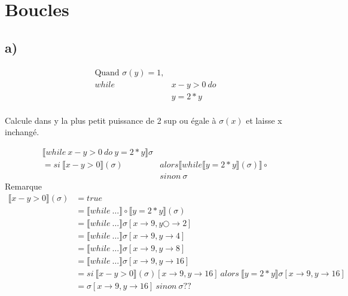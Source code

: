 \documentclass[11pt,a4paper]{article}
\newcommand{\llbr}{\llbracket}
\newcommand{\rrbr}{\rrbracket}
\begin{document}
	\section{Boucles}
	
	\subsection{a)}
	
	\begin{align*}
		\text{Quand } \sigma(y) = 1,&\\
		while\ &x - y > 0\ do\\
			&y = 2 * y\\
	\end{align*}
	
	Calcule dans y la plus petit puissance de 2 sup ou égale à $\sigma(x)$ et laisse x inchangé.
	
	\begin{align*}
		\llbracket while\ x - y > 0\ do\ y = 2 * y \rrbracket\sigma&\\
		= si\ \llbracket x - y > 0 \rrbracket(\sigma) &alors \llbracket while \llbracket y = 2 * y \rrbracket(\sigma)\rrbracket \circ\\
		&sinon\ \sigma
	\end{align*}
	Remarque
	\begin{align*}
		\llbracket x - y > 0 \rrbracket(\sigma) &= true\\
		&= \llbracket while\ \ldots \rrbracket \circ \llbracket y = 2 * y \rrbracket(\sigma)\\
		&= \llbr while\ \ldots \rrbr \sigma [ x \to 9, y○ \to 2]\\
		&= \llbr while\ \ldots \rrbr \sigma [x \to 9, y \to 4]\\
		&= \llbr while\ \ldots \rrbr \sigma [x \to 9, y \to 8]\\
		&= \llbr while\ \ldots \rrbr \sigma [x \to 9, y \to 16]\\
		&= si\  \llbr x - y > 0 \rrbr (\sigma) [x \to 9, y \to 16]\ alors\ \llbr y = 2 * y \rrbr \sigma [x \to 9, y \to 16]\\
		&= \sigma [x \to 9, y \to 16]\ sinon\ \sigma ??\\
	\end{align*}
\end{document}
